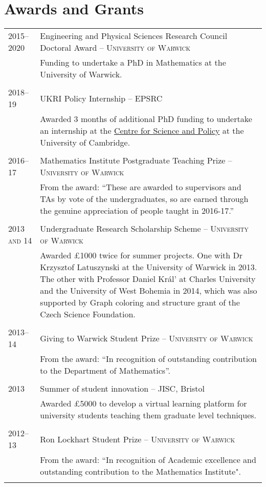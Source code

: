 \documentclass[a4paper,10pt]{article}
\begin{document}
\section{Awards and Grants}
\begin{tabular}{p{2.25cm}|p{15cm}}
	\textsc{2015--2020}& Engineering and Physical Sciences Research Council Doctoral Award -- \textsc{University of Warwick}\\&\footnotesize{Funding to undertake a PhD in Mathematics at the University of Warwick.}\\\multicolumn{2}{c}{} \\
	\textsc{2018--19}& UKRI Policy Internship -- \textsc{EPSRC}\\&\footnotesize{Awarded 3 months of additional PhD funding to undertake an internship at the \href{https://www.csap.cam.ac.uk/}{Centre for Science and Policy} at the University of Cambridge.}\\\multicolumn{2}{c}{} \\
	\textsc{2016--17}& Mathematics Institute Postgraduate Teaching Prize -- \textsc{University of Warwick}\\&\footnotesize{From the award: ``These are awarded to supervisors and TAs by vote of the undergraduates, so are earned through the genuine appreciation of people taught in 2016-17.”}\\\multicolumn{2}{c}{} \\
	\textsc{2013 and 14}& Undergraduate Research Scholarship Scheme -- \textsc{University of Warwick}\\&\footnotesize{Awarded £1000 twice for summer projects. One with Dr Krzysztof Latuszynski at the University of Warwick in 2013. The other with Professor Daniel Král' at Charles University and the University of West Bohemia in 2014, which was also supported by Graph coloring and structure grant of the Czech Science Foundation.}\\\multicolumn{2}{c}{} \\
	\textsc{2013--14}& Giving to Warwick Student Prize -- \textsc{University of Warwick}\\&\footnotesize{From the award: ``In recognition of outstanding contribution to the Department of Mathematics”.}\\\multicolumn{2}{c}{} \\
	\textsc{2013}& Summer of student innovation -- \textsc{JISC}, Bristol\\&\footnotesize{Awarded £5000 to develop a virtual learning platform for university students teaching them graduate level techniques.}\\\multicolumn{2}{c}{} \\
	\textsc{2012--13}& Ron Lockhart Student Prize -- \textsc{University of Warwick}\\&\footnotesize{From the award: ``In recognition of Academic excellence and outstanding contribution to the Mathematics Institute".}\\\multicolumn{2}{c}{} \\
\end{tabular}
\end{document}
